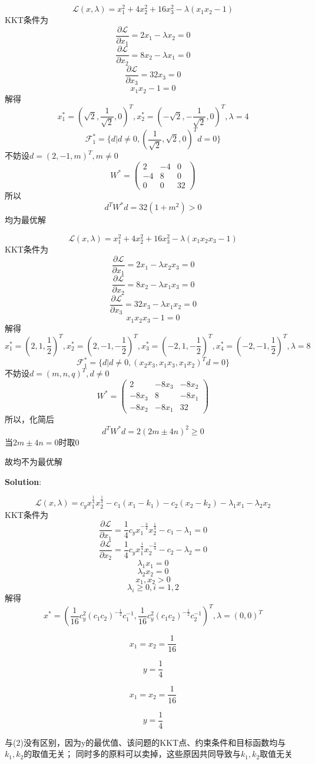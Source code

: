 \documentclass[a4 paper]{article}
\begin{document}

$$\mathcal{L}(x,\lambda) =x_1^2+4x_2^2+16x_3^2-\lambda(x_1 x_2-1)$$
KKT条件为
$$\frac{\partial \mathcal{L}}{\partial x_1}=2x_1-\lambda x_2=0$$
$$\frac{\partial \mathcal{L}}{\partial x_2}=8x_2-\lambda x_1=0$$
$$\frac{\partial \mathcal{L}}{\partial x_3}=32x_3=0$$
$$x_1x_2-1=0$$
解得
$$x_1^\ast=(\sqrt{2},\frac{1}{\sqrt{2}},0)^T,x_2^\ast=(-\sqrt{2},-\frac{1}{\sqrt{2}},0)^T,\lambda=4$$
$$\mathcal{F}_1^\ast=\{d|d\neq 0,(\frac{1}{\sqrt{2}},\sqrt{2},0)^Td=0\}$$
不妨设$d=(2,-1,m)^T,m\neq 0$
$$W^\ast=\begin{pmatrix}2& -4 & 0\\-4& 8 & 0\\0&0&32\end{pmatrix}$$
所以 $$ d^T W^\ast d=32(1+m^2)>0$$
均为最优解


$$\mathcal{L}(x,\lambda) =x_1^2+4x_2^2+16x_3^2-\lambda(x_1 x_2 x_3-1)$$
KKT条件为
$$\frac{\partial \mathcal{L}}{\partial x_1}=2x_1-\lambda x_2 x_3=0$$
$$\frac{\partial \mathcal{L}}{\partial x_2}=8x_2-\lambda x_1 x_3=0$$
$$\frac{\partial \mathcal{L}}{\partial x_3}=32x_3-\lambda x_1 x_2=0$$
$$x_1x_2x_3-1=0$$
解得
$$x_1^\ast=(2,1,\frac{1}{2})^T,x_2^\ast=(2,-1,-\frac{1}{2})^T,x_3^\ast=(-2,1,-\frac{1}{2})^T,x_4^\ast=(-2,-1,\frac{1}{2})^T,\lambda=8$$
$$\mathcal{F}_1^\ast=\{d|d\neq 0,(x_2 x_3,x_1x_3,x_1x_2)^Td=0\}$$
不妨设$d=(m,n,q)^T,d\neq 0$
$$W^\ast=\begin{pmatrix}2& -8x_3 & -8x_2\\-8x_3& 8 & -8x_1\\-8x_2&-8x_1&32\end{pmatrix}$$
所以，化简后 $$ d^T W^\ast d=2(2m\pm 4n)^2 \geqslant 0$$当$2m\pm4n=0$时取0

故均不为最优解

\textbf{Solution}:


$$\mathcal{L}(x,\lambda) =c_y x_1^{\frac{1}{4}} x_2^{\frac{1}{4}}-c_1(x_1-k_1)-c_2(x_2-k_2)-\lambda_1 x_1-\lambda_2 x_2$$
KKT条件为
$$\frac{\partial \mathcal{L}}{\partial x_1}=\frac{1}{4}c_y x_1^{-\frac{3}{4}}x_2^{\frac{1}{4}}-c_1-\lambda_1=0$$
$$\frac{\partial \mathcal{L}}{\partial x_2}=\frac{1}{4}c_y x_1^{\frac{1}{4}} x_2^{-\frac{3}{4}}-c_2-\lambda_2=0$$
$$\lambda_1x_1=0$$
$$\lambda_2x_2=0$$
$$x_1,x_2 >0$$
$$\lambda_i \geqslant 0, i=1,2$$
解得
$$x^\ast=(\frac{1}{16}c_y^2 (c_1c_2)^{-\frac{1}{2}}c_1^{-1},\frac{1}{16}c_y^2 (c_1c_2)^{-\frac{1}{2}}c_2^{-1})^T,\lambda=(0,0)^T$$


$$x_1=x_2=\frac{1}{16}$$

$$y=\frac{1}{4}$$


$$x_1=x_2=\frac{1}{16}$$

$$y=\frac{1}{4}$$

与(2)没有区别，因为y的最优值、该问题的KKT点、约束条件和目标函数均与$k_1,k_2$的取值无关；
同时多的原料可以卖掉，这些原因共同导致与$k_1,k_2$取值无关
\end{document}
